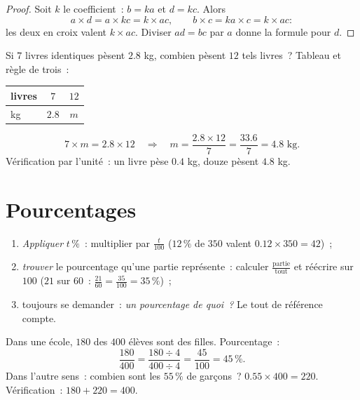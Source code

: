 \begin{proof}
Soit $k$ le coefficient~: $b = ka$ et $d = kc$. Alors
\[
a \times d = a \times kc = k \times ac,
\qquad
b \times c = ka \times c = k \times ac :
\]
les deux  en croix valent $k \times ac$. Diviser $ad = bc$
par $a$ donne la formule pour $d$.
\end{proof}

\begin{example}\label{ex:g7:prop:fourth}
Si $7$ livres identiques pèsent $2.8$ kg, combien pèsent $12$ tels
livres~? Tableau et règle de trois~:
\begin{center}
\renewcommand{\arraystretch}{1.3}
\begin{tabular}{l|cc}
livres & $7$ & $12$ \\
\hline
kg & $2.8$ & $m$ \\
\end{tabular}
\end{center}
\[
7 \times m = 2.8 \times 12
\quad\Longrightarrow\quad
m = \frac{2.8 \times 12}{7} = \frac{33.6}{7} = 4.8 \text{ kg}.
\]
Vérification par l'unité~: un livre pèse $0.4$ kg, douze pèsent
$4.8$ kg.
\end{example}

\section{Pourcentages}

\begin{method}\label{met:g7:prop:percent}
\begin{enumerate}
  \item \emph{Appliquer} $t\,\%$~: multiplier par $\frac{t}{100}$
        ($12\,\%$ de $350$ valent $0.12 \times 350 = 42$)~;
  \item \emph{trouver} le pourcentage qu'une partie représente~:
        calculer $\frac{\text{partie}}{\text{tout}}$ et réécrire sur
        $100$ ($21$ sur $60$~: $\frac{21}{60} = \frac{35}{100} =
        35\,\%$)~;
  \item toujours se demander~: \emph{un pourcentage de quoi~?} Le
        tout de référence compte.
\end{enumerate}
\end{method}

\begin{example}\label{ex:g7:prop:percent}
Dans une école, $180$ des $400$ élèves sont des filles.
Pourcentage~:
\[
\frac{180}{400} = \frac{180 \div 4}{400 \div 4} = \frac{45}{100}
= 45\,\% .
\]
Dans l'autre sens~: combien sont les $55\,\%$ de garçons~?
$0.55 \times 400 = 220$. Vérification~: $180 + 220 = 400$.
\end{example}

